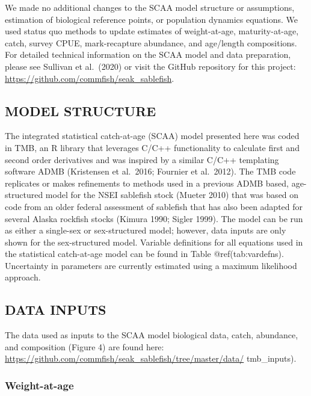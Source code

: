 \documentclass[
]{article}
\begin{document}
We made no additional changes to the SCAA model structure or
assumptions, estimation of biological reference points, or population
dynamics equations. We used status quo methods to update estimates of
weight-at-age, maturity-at-age, catch, survey CPUE, mark-recapture
abundance, and age/length compositions. For detailed technical
information on the SCAA model and data preparation, please see Sullivan
et al.~(2020) or visit the GitHub repository for this project:
\url{https://github.com/commfish/seak_sablefish}.

\hypertarget{model-structure}{%
\subsection{MODEL STRUCTURE}\label{model-structure}}

The integrated statistical catch-at-age (SCAA) model presented here was
coded in TMB, an R library that leverages C/C++ functionality to
calculate first and second order derivatives and was inspired by a
similar C/C++ templating software ADMB (Kristensen et al.~2016; Fournier
et al.~2012). The TMB code replicates or makes refinements to methods
used in a previous ADMB based, age-structured model for the NSEI
sablefish stock (Mueter 2010) that was based on code from an older
federal assessment of sablefish that has also been adapted for several
Alaska rockfish stocks (Kimura 1990; Sigler 1999). The model can be run
as either a single-sex or sex-structured model; however, data inputs are
only shown for the sex-structured model. Variable definitions for all
equations used in the statistical catch-at-age model can be found in
Table @ref(tab:vardefns). Uncertainty in parameters are currently
estimated using a maximum likelihood approach.

\hypertarget{data-inputs}{%
\subsection{DATA INPUTS}\label{data-inputs}}

The data used as inputs to the SCAA model biological data, catch,
abundance, and composition (Figure 4) are found here:
\url{https://github.com/commfish/seak_sablefish/tree/master/data/}
tmb\_inputs).

\hypertarget{weight-at-age}{%
\subsubsection{Weight-at-age}\label{weight-at-age}}
\end{document}
